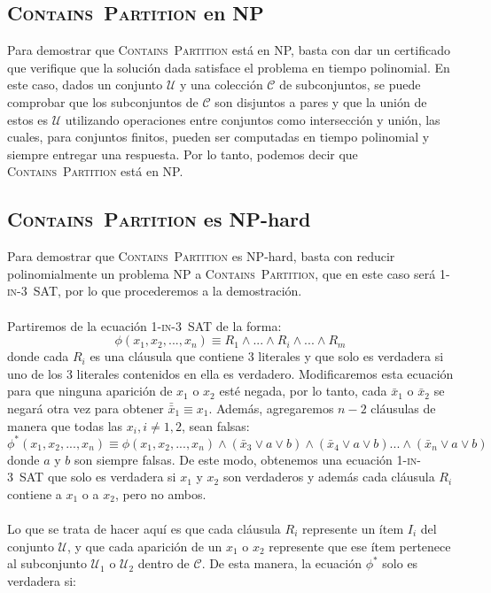 \documentclass[spanish]{article}
\begin{document}
\subsection{\textsc{Contains~Partition} en NP}
    Para demostrar que \textsc{Contains~Partition} está en NP, basta con dar un certificado
    que verifique que la solución dada satisface el problema en tiempo polinomial.
    En este caso, dados un conjunto \(\mathcal{U}\) y una colección \(\mathcal{C}\) de subconjuntos,
    se puede comprobar que los subconjuntos de \(\mathcal{C}\) son disjuntos a pares y que la unión de
    estos es \(\mathcal{U}\) utilizando operaciones entre conjuntos como intersección y unión, las cuales,
    para conjuntos finitos, pueden ser computadas en tiempo polinomial y siempre entregar una respuesta.
    Por lo tanto, podemos decir que \textsc{Contains~Partition} está en NP.

\subsection{\textsc{Contains~Partition} es NP-hard}
    Para demostrar que \textsc{Contains~Partition} es NP-hard, basta con reducir polinomialmente un problema NP a \textsc{Contains~Partition}, que en
    este caso será \textsc{1-in-3~SAT}, por lo que procederemos a la demostración.
    \\\\
    Partiremos de la ecuación \textsc{1-in-3~SAT} de la forma:
    $$\phi(x_1, x_2, ..., x_n) \equiv R_1 \wedge ... \wedge R_i \wedge ... \wedge R_m$$
    donde cada $R_i$ es una cláusula que contiene 3 literales y que solo es verdadera si uno de los 3 literales contenidos
    en ella es verdadero. Modificaremos esta ecuación para que ninguna aparición de $x_1$ o $x_2$ esté negada, por lo tanto,
    cada $\bar{x}_1$ o $\bar{x}_2$ se negará otra vez para obtener $\bar{\bar{x}}_1 \equiv x_1$. Además, agregaremos $n-2$ cláusulas
    de manera que todas las $x_i, i \neq 1, 2$, sean falsas:
    $$\phi^*(x_1, x_2, ..., x_n) \equiv \phi(x_1, x_2, ..., x_n) \wedge (\bar{x}_3 \vee a \vee b) \wedge (\bar{x}_4 \vee a \vee b) ... \wedge (\bar{x}_n \vee a \vee b)$$
    donde $a$ y $b$ son siempre falsas. De este modo, obtenemos una ecuación \textsc{1-in-3~SAT} que solo es verdadera si $x_1$ y $x_2$ son
    verdaderos y además cada cláusula $R_i$ contiene a $x_1$ o a $x_2$, pero no ambos.
    \\\\
    Lo que se trata de hacer aquí es que cada cláusula $R_i$ represente un ítem $I_i$ del conjunto \(\mathcal{U}\), y que cada
    aparición de un $x_1$ o $x_2$ represente que ese ítem pertenece al subconjunto \(\mathcal{U}_1\) o \(\mathcal{U}_2\) dentro
    de \(\mathcal{C}\). De esta manera, la ecuación $\phi^*$ solo es verdadera si:
\end{document}
